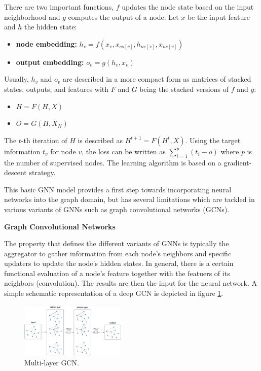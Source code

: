 \documentclass[a4paper,preprint]{sig-alternate}
\begin{document}
There are two important functions, $f$ updates the node state based on the input neighborhood and $g$ computes the output of a node.
Let $x$ be the input feature and $h$ the hidden state:
\begin{itemize}
    \item \textbf{node embedding:} $h_v = f(x_v, x_{co[v]}, h_{ne[v]}, x_{ne[v]})$
    \item \textbf{output embedding:} $o_v = g(h_v, x_v)$
\end{itemize}

Usually, $h_v$ and $o_v$ are described in a more compact form as matrices of stacked states,
outputs, and features with $F$ and $G$ being the stacked versions of $f$ and $g$:
\begin{itemize}
    \item $H = F(H, X)$
    \item $O = G(H, X_N)$
\end{itemize}

The $t$-th iteration of $H$ is described as $H^{t + 1} = F(H^t, X)$.
Using the target information $t_v$ for node $v$, the loss can be written as $\sum_{i=1}^p (t_i - o)$
where $p$ is the number of supervised nodes. The learning algorithm is based on a gradient-descent strategy.\newline

\vfill
\pagebreak

This basic GNN model provides a first step towards incorporating neural networks into the graph domain, 
but has several limitations \cite{article} which are tackled in various variants of GNNs such as graph convolutional networks (GCNs).\newline

\textbf{Graph Convolutional Networks}\newline

The property that defines the different variants of GNNs is typically the aggregator to gather information from each node's neighbors
and specific updaters to update the node's hidden states. \cite{zhou2019graph} In general, there is a certain functional evaluation of
a node's feature together with the featuers of its neighbors (convolution). The results are then the input for the neural network.
A simple schematic representation of a deep GCN is depicted in figure \ref{fig:gcn}.
\begin{figure}[h]
    \centering
    \includegraphics[width=0.45\textwidth]{img/gcn.png}
    \caption{Multi-layer GCN. \cite{kipf2016semi}}
    \label{fig:gcn}
\end{figure}
\end{document}
